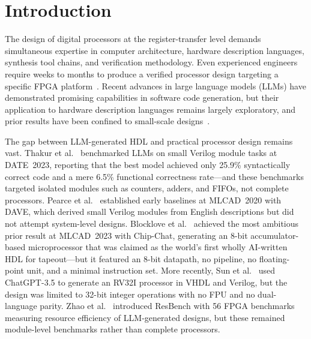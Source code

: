 \documentclass[journal]{IEEEtran}
\begin{document}
\section{Introduction}
\label{sec:intro}

The design of digital processors at the register-transfer level demands
simultaneous expertise in computer architecture, hardware description
languages, synthesis tool chains, and verification methodology.  Even
experienced engineers require weeks to months to produce a verified
processor design targeting a specific FPGA platform~\cite{patterson2017cod}.
Recent advances in large language models (LLMs) have demonstrated
promising capabilities in software code generation, but their
application to hardware description languages remains largely
exploratory, and prior results have been confined to small-scale
designs~\cite{thakur2023date,blocklove2023chipchat,pearce2020dave,sun2024hdlgen,zhao2025resbench}.

The gap between LLM-generated HDL and practical processor design remains
vast.  Thakur et al.~\cite{thakur2023date} benchmarked LLMs on small
Verilog module tasks at DATE~2023, reporting that the best model achieved
only 25.9\% syntactically correct code and a mere 6.5\% functional
correctness rate---and these benchmarks targeted isolated modules such as
counters, adders, and FIFOs, not complete processors.  Pearce et
al.~\cite{pearce2020dave} established early baselines at MLCAD~2020 with
DAVE, which derived small Verilog modules from English descriptions but
did not attempt system-level designs.  Blocklove et
al.~\cite{blocklove2023chipchat} achieved the most ambitious prior result
at MLCAD~2023 with Chip-Chat, generating an 8-bit accumulator-based
microprocessor that was claimed as the world's first wholly AI-written
HDL for tapeout---but it featured an 8-bit datapath, no pipeline, no
floating-point unit, and a minimal instruction set.  More recently, Sun
et al.~\cite{sun2024hdlgen} used ChatGPT-3.5 to generate an RV32I
processor in VHDL and Verilog, but the design was limited to 32-bit
integer operations with no FPU and no dual-language parity.  Zhao et
al.~\cite{zhao2025resbench} introduced ResBench with 56 FPGA benchmarks
measuring resource efficiency of LLM-generated designs, but these
remained module-level benchmarks rather than complete processors.
\end{document}
